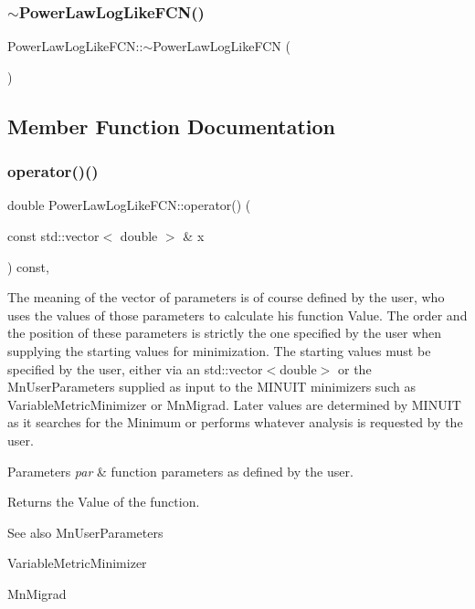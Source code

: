 \subsubsection{\texorpdfstring{$\sim$PowerLawLogLikeFCN()}{~PowerLawLogLikeFCN()}}
{\footnotesize\ttfamily Power\+Law\+Log\+Like\+F\+C\+N\+::$\sim$\+Power\+Law\+Log\+Like\+F\+CN (\begin{DoxyParamCaption}{ }\end{DoxyParamCaption})\hspace{0.3cm}{\ttfamily [inline]}}



\subsection{Member Function Documentation}
\mbox{\label{classPowerLawLogLikeFCN_a279b7010b6b252d0772e5d561f749386}} 
\subsubsection{\texorpdfstring{operator()()}{operator()()}}
{\footnotesize\ttfamily double Power\+Law\+Log\+Like\+F\+C\+N\+::operator() (\begin{DoxyParamCaption}\item[{const std\+::vector$<$ double $>$ \&}]{x }\end{DoxyParamCaption}) const\hspace{0.3cm}{\ttfamily [inline]}, {\ttfamily [virtual]}}

The meaning of the vector of parameters is of course defined by the user, who uses the values of those parameters to calculate his function Value. The order and the position of these parameters is strictly the one specified by the user when supplying the starting values for minimization. The starting values must be specified by the user, either via an std\+::vector$<$double$>$ or the Mn\+User\+Parameters supplied as input to the M\+I\+N\+U\+IT minimizers such as Variable\+Metric\+Minimizer or Mn\+Migrad. Later values are determined by M\+I\+N\+U\+IT as it searches for the Minimum or performs whatever analysis is requested by the user.


\begin{DoxyParams}{Parameters}
{\em par} & function parameters as defined by the user.\\
\hline
\end{DoxyParams}
\begin{DoxyReturn}{Returns}
the Value of the function.
\end{DoxyReturn}
\begin{DoxySeeAlso}{See also}
Mn\+User\+Parameters 

Variable\+Metric\+Minimizer 

Mn\+Migrad 
\end{DoxySeeAlso}


